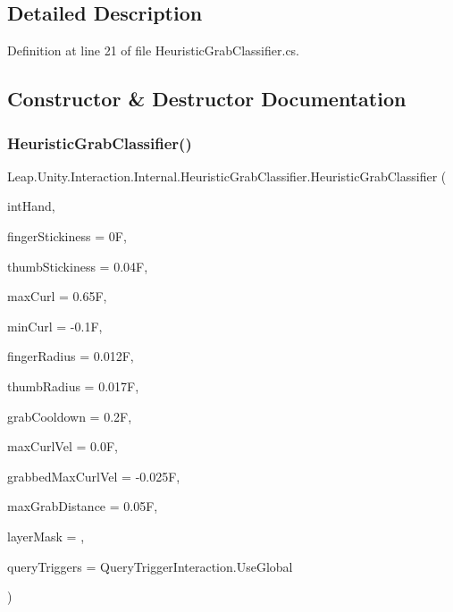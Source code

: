\subsection{Detailed Description}


Definition at line 21 of file Heuristic\+Grab\+Classifier.\+cs.



\subsection{Constructor \& Destructor Documentation}
\mbox{\label{class_leap_1_1_unity_1_1_interaction_1_1_internal_1_1_heuristic_grab_classifier_a6ec6f734b62f6ef4b18af44906aeebdd}} 
\subsubsection{\texorpdfstring{HeuristicGrabClassifier()}{HeuristicGrabClassifier()}}
{\footnotesize\ttfamily Leap.\+Unity.\+Interaction.\+Internal.\+Heuristic\+Grab\+Classifier.\+Heuristic\+Grab\+Classifier (\begin{DoxyParamCaption}\item[{\mbox{\hyperlink{class_leap_1_1_unity_1_1_interaction_1_1_interaction_hand}{Interaction\+Hand}}}]{int\+Hand,  }\item[{float}]{finger\+Stickiness = {\ttfamily 0F},  }\item[{float}]{thumb\+Stickiness = {\ttfamily 0.04F},  }\item[{float}]{max\+Curl = {\ttfamily 0.65F},  }\item[{float}]{min\+Curl = {\ttfamily -\/0.1F},  }\item[{float}]{finger\+Radius = {\ttfamily 0.012F},  }\item[{float}]{thumb\+Radius = {\ttfamily 0.017F},  }\item[{float}]{grab\+Cooldown = {\ttfamily 0.2F},  }\item[{float}]{max\+Curl\+Vel = {\ttfamily 0.0F},  }\item[{float}]{grabbed\+Max\+Curl\+Vel = {\ttfamily -\/0.025F},  }\item[{float}]{max\+Grab\+Distance = {\ttfamily 0.05F},  }\item[{int}]{layer\+Mask = {},  }\item[{Query\+Trigger\+Interaction}]{query\+Triggers = {\ttfamily QueryTriggerInteraction.UseGlobal} }\end{DoxyParamCaption})}



